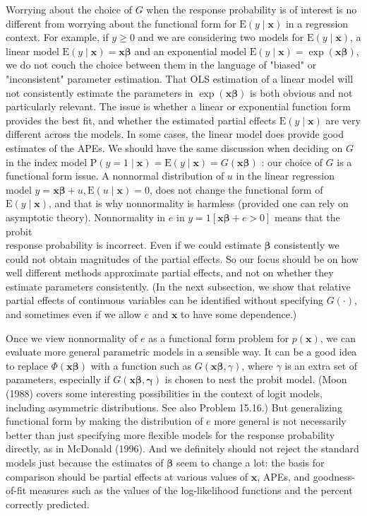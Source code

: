 \documentclass[10pt]{article}
\begin{document}
Worrying about the choice of $G$ when the response probability is of interest is no different from worrying about the functional form for $\mathrm{E}(y \mid \mathbf{x})$ in a regression context. For example, if $y \geq 0$ and we are considering two models for $\mathrm{E}(y \mid \mathbf{x})$, a linear model $\mathrm{E}(y \mid \mathbf{x})=\mathbf{x} \boldsymbol{\beta}$ and an exponential model $\mathrm{E}(y \mid \mathbf{x})=\exp (\mathbf{x} \boldsymbol{\beta})$, we do not couch the choice between them in the language of "biased" or "inconsistent" parameter estimation. That OLS estimation of a linear model will not consistently estimate the parameters in $\exp (\mathbf{x} \boldsymbol{\beta})$ is both obvious and not particularly relevant. The issue is whether a linear or exponential function form provides the best fit, and whether the estimated partial effects $\mathrm{E}(y \mid \mathbf{x})$ are very different across the models. In some cases, the linear model does provide good estimates of the APEs. We should have the same discussion when deciding on $G$ in the index model $\mathrm{P}(y=1 \mid \mathbf{x})=\mathrm{E}(y \mid \mathbf{x})=G(\mathbf{x} \boldsymbol{\beta})$ : our choice of $G$ is a functional form issue. A nonnormal distribution of $u$ in the linear regression model $y=\mathbf{x} \boldsymbol{\beta}+u, \mathrm{E}(u \mid \mathbf{x})=0$, does not change the functional form of $\mathrm{E}(y \mid \mathbf{x})$, and that is why nonnormality is harmless (provided one can rely on asymptotic theory). Nonnormality in $e$ in $y=1[\mathbf{x} \boldsymbol{\beta}+e>0]$ means that the probit\\
response probability is incorrect. Even if we could estimate $\boldsymbol{\beta}$ consistently we could not obtain magnitudes of the partial effects. So our focus should be on how well different methods approximate partial effects, and not on whether they estimate parameters consistently. (In the next subsection, we show that relative partial effects of continuous variables can be identified without specifying $G(\cdot)$, and sometimes even if we allow $e$ and $\mathbf{x}$ to have some dependence.)

Once we view nonnormality of $e$ as a functional form problem for $p(\mathbf{x})$, we can evaluate more general parametric models in a sensible way. It can be a good idea to replace $\Phi(\mathbf{x} \boldsymbol{\beta})$ with a function such as $G(\mathbf{x} \boldsymbol{\beta}, \gamma)$, where $\gamma$ is an extra set of parameters, especially if $G(\mathbf{x} \boldsymbol{\beta}, \boldsymbol{\gamma})$ is chosen to nest the probit model. (Moon (1988) covers some interesting possibilities in the context of logit models, including asymmetric distributions. See also Problem 15.16.) But generalizing functional form by making the distribution of $e$ more general is not necessarily better than just specifying more flexible models for the response probability directly, as in McDonald (1996). And we definitely should not reject the standard models just because the estimates of $\boldsymbol{\beta}$ seem to change a lot: the basis for comparison should be partial effects at various values of $\mathbf{x}$, APEs, and goodness-of-fit measures such as the values of the log-likelihood functions and the percent correctly predicted.
\end{document}
